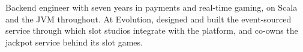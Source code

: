 
\begin{cvparagraph}
	Backend engineer with seven years in payments and real-time gaming, on Scala and the JVM throughout.
	At Evolution, designed and built the event-sourced service through which slot studios integrate with the platform, and co-owns the jackpot service behind its slot games.
\end{cvparagraph}
